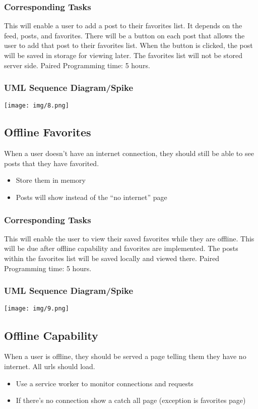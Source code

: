 \documentclass[12pt]{article}
\begin{document}
\subsubsection{Corresponding Tasks}
	This will enable a user to add a post to their favorites list.  It depends on the feed, posts, and favorites.  There will be a button on each post that allows the user to add that post to their favorites list.  When the button is clicked, the post will be saved in storage for viewing later.  The favorites list will not be stored server side. Paired Programming time: 5 hours.
\subsubsection{UML Sequence Diagram/Spike}
\texttt{[image: img/8.png]}\linebreak

\subsection{Offline Favorites}
When a user doesn’t have an internet connection, they should still be able to
see posts that they have favorited.
\begin{itemize}
  \item Store them in memory
  \item Posts will show instead of the “no internet” page
\end{itemize}
\subsubsection{Corresponding Tasks}
	This will enable the user to view their saved favorites while they are offline.  This will be due after offline capability and favorites are implemented.  The posts within the favorites list will be saved locally and viewed there.  Paired Programming time: 5 hours.
\subsubsection{UML Sequence Diagram/Spike}
\texttt{[image: img/9.png]}\linebreak

\subsection{Offline Capability}
When a user is offline, they should be served a page telling them they have no
internet. All urls should load.
\begin{itemize}
  \item Use a service worker to monitor connections and requests
  \item If there’s no connection show a catch all page (exception is favorites page)
\end{itemize}
\end{document}
